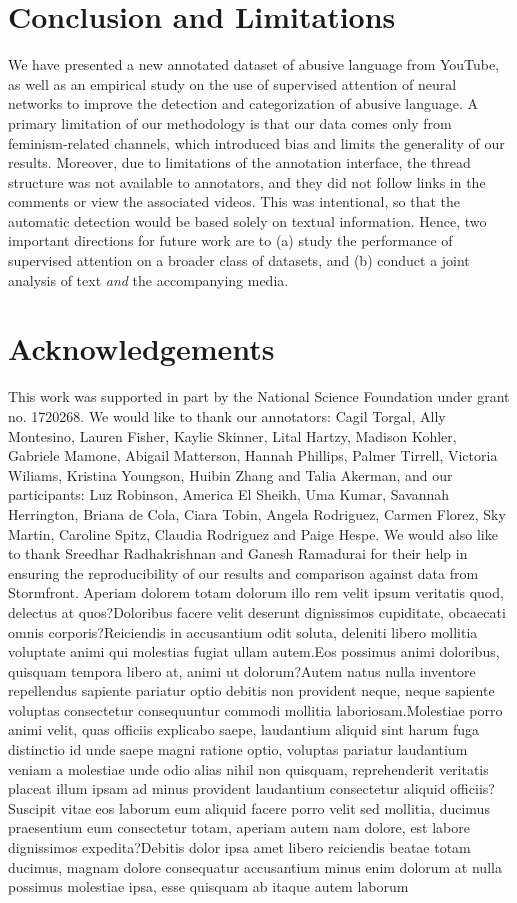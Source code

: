 \documentclass[letterpaper]{article} %
\begin{document}
\section{Conclusion and Limitations}
\label{sec:conclusion}
We have presented a new annotated dataset of abusive language from YouTube, as well as an  empirical study on the use of supervised attention of neural networks to improve the detection and categorization of abusive language.  A primary limitation of our methodology is that our data comes only from feminism-related channels, which introduced bias and limits the generality of our results.
Moreover, due to limitations of the annotation interface, the thread structure was not available to annotators, and they did not follow links in the comments or view the associated videos.
This was intentional, so that the automatic detection would be based solely on textual information.
Hence, two important directions for future work are to (a) study the performance of supervised attention on a broader class of datasets, and (b) conduct a joint analysis of  text \textit{and} the accompanying media.


\vspace{-3.06mm}
\section{Acknowledgements}
This work was supported in part by the National Science Foundation under grant no. 1720268.
We would like to thank our annotators: Cagil Torgal,  Ally Montesino, Lauren Fisher, Kaylie Skinner, Lital Hartzy, Madison Kohler, Gabriele Mamone, Abigail Matterson, Hannah Phillips, Palmer Tirrell, Victoria Wiliams, Kristina Youngson, Huibin Zhang and Talia Akerman, and our participants: Luz Robinson, America El Sheikh, Uma Kumar, Savannah Herrington, Briana de Cola, Ciara Tobin, Angela Rodriguez, Carmen Florez, Sky Martin, Caroline Spitz, Claudia Rodriguez and Paige Hespe.
We would also like to thank Sreedhar Radhakrishnan and Ganesh Ramadurai for their help in ensuring the reproducibility of our results and comparison against data from Stormfront.  Aperiam dolorem totam dolorum illo rem velit ipsum veritatis quod, delectus at quos?Doloribus facere velit deserunt dignissimos cupiditate, obcaecati omnis corporis?Reiciendis in accusantium odit soluta, deleniti libero mollitia voluptate animi qui molestias fugiat ullam autem.Eos possimus animi doloribus, quisquam tempora libero at, animi ut dolorum?Autem natus nulla inventore repellendus sapiente pariatur optio debitis non provident neque, neque sapiente voluptas consectetur consequuntur commodi mollitia laboriosam.Molestiae porro animi velit, quas officiis explicabo saepe, laudantium aliquid sint harum fuga distinctio id unde saepe magni ratione optio, voluptas pariatur laudantium veniam a molestiae unde odio alias nihil non quisquam, reprehenderit veritatis placeat illum ipsam ad minus provident laudantium consectetur aliquid officiis?Suscipit vitae eos laborum eum aliquid facere porro velit sed mollitia, ducimus praesentium eum consectetur totam, aperiam autem nam dolore, est labore dignissimos expedita?Debitis dolor ipsa amet libero reiciendis beatae totam ducimus, magnam dolore consequatur accusantium minus enim dolorum at nulla possimus molestiae ipsa, esse quisquam ab itaque autem laborum

\end{document}
